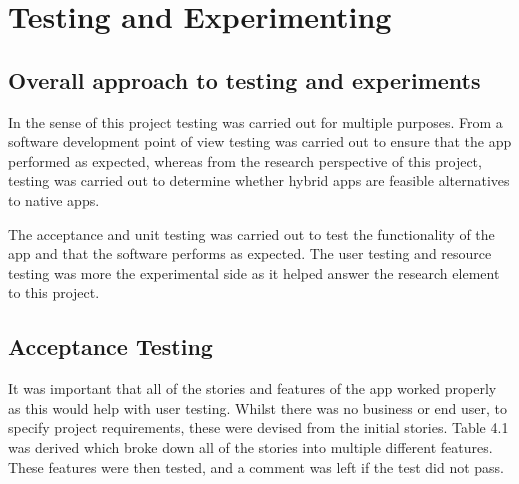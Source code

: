 \chapter{Testing and Experimenting}


\section{Overall approach to testing and experiments}
In the sense of this project testing was carried out for multiple purposes. From a software development point of view testing was carried out to ensure that the app performed as expected, whereas from the research perspective of this project, testing was carried out to determine whether hybrid apps are feasible alternatives to native apps.

The acceptance and unit testing was carried out to test the functionality of the app and that the software performs as expected. The user testing and resource testing was more the experimental side as it helped answer the research element to this project.

\section{Acceptance Testing}
It was important that all of the stories and features of the app worked properly as this would help with user testing. Whilst there was no business or end user, to specify project requirements, these were devised from the initial stories. Table 4.1 was derived which broke down all of the stories into multiple different features. These features were then tested, and a comment was left if the test did not pass.

